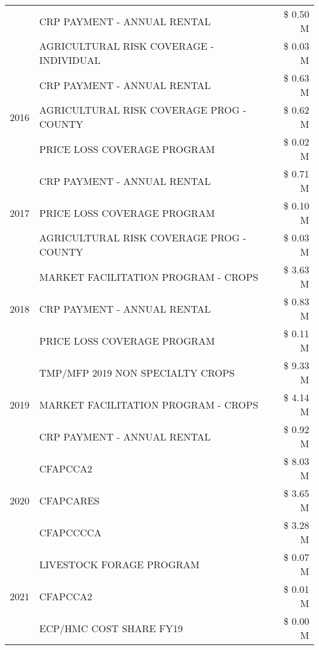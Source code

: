 \begin{tabular}{llr}
 & CRP PAYMENT - ANNUAL RENTAL & \$ 0.50 M \\
 & AGRICULTURAL RISK COVERAGE - INDIVIDUAL & \$ 0.03 M \\
\cline{1-3}
\multirow[t]{3}{*}{2016} & CRP PAYMENT - ANNUAL RENTAL & \$ 0.63 M \\
 & AGRICULTURAL RISK COVERAGE PROG - COUNTY & \$ 0.62 M \\
 & PRICE LOSS COVERAGE PROGRAM & \$ 0.02 M \\
\cline{1-3}
\multirow[t]{3}{*}{2017} & CRP PAYMENT - ANNUAL RENTAL & \$ 0.71 M \\
 & PRICE LOSS COVERAGE PROGRAM & \$ 0.10 M \\
 & AGRICULTURAL RISK COVERAGE PROG - COUNTY & \$ 0.03 M \\
\cline{1-3}
\multirow[t]{3}{*}{2018} & MARKET FACILITATION PROGRAM - CROPS & \$ 3.63 M \\
 & CRP PAYMENT - ANNUAL RENTAL & \$ 0.83 M \\
 & PRICE LOSS COVERAGE PROGRAM & \$ 0.11 M \\
\cline{1-3}
\multirow[t]{3}{*}{2019} & TMP/MFP 2019 NON SPECIALTY CROPS & \$ 9.33 M \\
 & MARKET FACILITATION PROGRAM - CROPS & \$ 4.14 M \\
 & CRP PAYMENT - ANNUAL RENTAL & \$ 0.92 M \\
\cline{1-3}
\multirow[t]{3}{*}{2020} & CFAPCCA2 & \$ 8.03 M \\
 & CFAPCARES & \$ 3.65 M \\
 & CFAPCCCCA & \$ 3.28 M \\
\cline{1-3}
\multirow[t]{3}{*}{2021} & LIVESTOCK FORAGE PROGRAM & \$ 0.07 M \\
 & CFAPCCA2 & \$ 0.01 M \\
 & ECP/HMC COST SHARE FY19 & \$ 0.00 M \\
\cline{1-3}
\bottomrule
\end{tabular}
